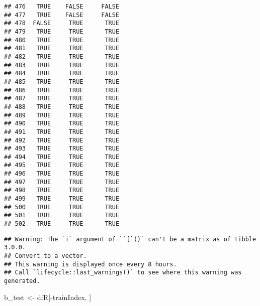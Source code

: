 \documentclass[
]{article}
\newenvironment{Shaded}{\begin{snugshade}}{\end{snugshade}}
\newcommand{\AttributeTok}[1]{\textcolor[rgb]{0.77,0.63,0.00}{#1}}
\newcommand{\ConstantTok}[1]{\textcolor[rgb]{0.00,0.00,0.00}{#1}}
\newcommand{\DecValTok}[1]{\textcolor[rgb]{0.00,0.00,0.81}{#1}}
\newcommand{\FunctionTok}[1]{\textcolor[rgb]{0.00,0.00,0.00}{#1}}
\newcommand{\NormalTok}[1]{#1}
\newcommand{\OtherTok}[1]{\textcolor[rgb]{0.56,0.35,0.01}{#1}}
\newcommand{\SpecialCharTok}[1]{\textcolor[rgb]{0.00,0.00,0.00}{#1}}
\begin{document}
\begin{verbatim}
## 476   TRUE    FALSE     FALSE
## 477   TRUE    FALSE     FALSE
## 478  FALSE     TRUE      TRUE
## 479   TRUE     TRUE      TRUE
## 480   TRUE     TRUE      TRUE
## 481   TRUE     TRUE      TRUE
## 482   TRUE     TRUE      TRUE
## 483   TRUE     TRUE      TRUE
## 484   TRUE     TRUE      TRUE
## 485   TRUE     TRUE      TRUE
## 486   TRUE     TRUE      TRUE
## 487   TRUE     TRUE      TRUE
## 488   TRUE     TRUE      TRUE
## 489   TRUE     TRUE      TRUE
## 490   TRUE     TRUE      TRUE
## 491   TRUE     TRUE      TRUE
## 492   TRUE     TRUE      TRUE
## 493   TRUE     TRUE      TRUE
## 494   TRUE     TRUE      TRUE
## 495   TRUE     TRUE      TRUE
## 496   TRUE     TRUE      TRUE
## 497   TRUE     TRUE      TRUE
## 498   TRUE     TRUE      TRUE
## 499   TRUE     TRUE      TRUE
## 500   TRUE     TRUE      TRUE
## 501   TRUE     TRUE      TRUE
## 502   TRUE     TRUE      TRUE
\end{verbatim}

\begin{Shaded}
\end{Shaded}

\begin{verbatim}
## Warning: The `i` argument of ``[`()` can't be a matrix as of tibble 3.0.0.
## Convert to a vector.
## This warning is displayed once every 8 hours.
## Call `lifecycle::last_warnings()` to see where this warning was generated.
\end{verbatim}

\begin{Shaded}
\begin{Highlighting}[]
\NormalTok{b\_test  }\OtherTok{\textless{}{-}}\NormalTok{ dfR[}\SpecialCharTok{{-}}\NormalTok{trainIndex, ]}
\end{Highlighting}
\end{Shaded}
\end{document}
